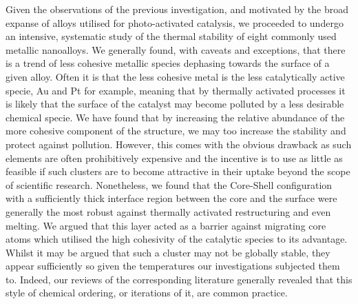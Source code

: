 Given the observations of the previous investigation, and motivated by the broad expanse of alloys utilised for photo-activated catalysis, we proceeded to undergo an intensive, systematic study of the thermal stability of eight commonly used metallic nanoalloys. We generally found, with caveats and exceptions, that there is a trend of less cohesive metallic species dephasing towards the surface of a given alloy. Often it is that the less cohesive metal is the less catalytically active specie, Au and Pt for example, meaning that by thermally activated processes it is likely that the surface of the catalyst may become polluted by a less desirable chemical specie. We have found that by increasing the relative abundance of the more cohesive component of the structure, we may too increase the stability and protect against pollution. However, this comes with the obvious drawback as such elements are often prohibitively expensive and the incentive is to use as little as feasible if such clusters are to become attractive in their uptake beyond the scope of scientific research. Nonetheless, we found that the Core-Shell configuration with a sufficiently thick interface region between the core and the surface were generally the most robust against thermally activated restructuring and even melting. We argued that this layer acted as a barrier against migrating core atoms which utilised the high cohesivity of the catalytic species to its advantage. Whilst it may be argued that such a cluster may not be globally stable, they appear sufficiently so given the temperatures our investigations subjected them to. Indeed, our reviews of the corresponding literature generally revealed that this style of chemical ordering, or iterations of it, are common practice.

